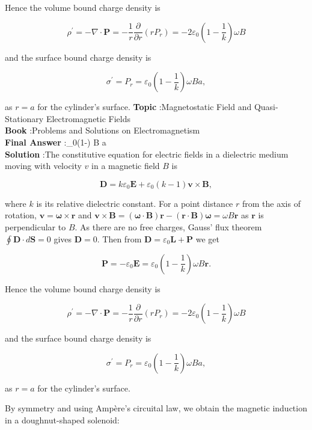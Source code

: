 \documentclass[10pt]{article}
\begin{document}
Hence the volume bound charge density is

$$
\rho^{\prime}=-\nabla \cdot \mathbf{P}=-\frac{1}{r} \frac{\partial}{\partial r}\left(r P_{r}\right)=-2 \varepsilon_{0}\left(1-\frac{1}{k}\right) \omega B
$$

and the surface bound charge density is

$$
\sigma^{\prime}=P_{r}=\varepsilon_{0}\left(1-\frac{1}{k}\right) \omega B a,
$$

as $r=a$ for the cylinder's surface.
\textbf{Topic} :Magnetostatic Field and Quasi-Stationary Electromagnetic Fields\\
\textbf{Book} :Problems and Solutions on Electromagnetism\\
\textbf{Final Answer} :\varepsilon_{0}\left(1-\right) \omega B a\\


\textbf{Solution} :The constitutive equation for electric fields in a dielectric medium moving with velocity $v$ in a magnetic field $B$ is

$$
\mathbf{D}=k \varepsilon_{0} \mathbf{E}+\varepsilon_{0}(k-1) \mathbf{v} \times \mathbf{B},
$$

where $k$ is its relative dielectric constant. For a point distance $r$ from the axis of rotation, $\mathbf{v}=\boldsymbol{\omega} \times \mathbf{r}$ and $\mathbf{v} \times \mathbf{B}=(\boldsymbol{\omega} \cdot \mathbf{B}) \mathbf{r}-(\mathbf{r} \cdot \mathbf{B}) \boldsymbol{\omega}=\omega B \mathbf{r}$ as $\mathbf{r}$ is perpendicular to $B$. As there are no free charges, Gauss' flux theorem $\oint \mathbf{D} \cdot d \mathbf{S}=0$ gives $\mathbf{D}=0$. Then from $\mathbf{D}=\varepsilon_{0} \mathbf{L}+\mathbf{P}$ we get

$$
\mathbf{P}=-\varepsilon_{0} \mathbf{E}=\varepsilon_{0}\left(1-\frac{1}{k}\right) \omega B \mathbf{r} .
$$

Hence the volume bound charge density is

$$
\rho^{\prime}=-\nabla \cdot \mathbf{P}=-\frac{1}{r} \frac{\partial}{\partial r}\left(r P_{r}\right)=-2 \varepsilon_{0}\left(1-\frac{1}{k}\right) \omega B
$$

and the surface bound charge density is

$$
\sigma^{\prime}=P_{r}=\varepsilon_{0}\left(1-\frac{1}{k}\right) \omega B a,
$$

as $r=a$ for the cylinder's surface.

 By symmetry and using Ampère's circuital law, we obtain the magnetic induction in a doughnut-shaped solenoid:
\end{document}
